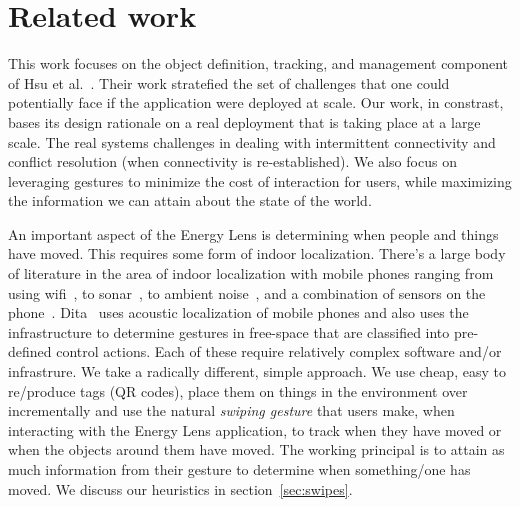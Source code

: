 \section{Related work}


This work focuses on the object definition, tracking, and management component of Hsu et al.~\cite{hbci}.  Their
work stratefied the set of challenges that one could potentially face if the application were deployed at scale.  Our
work, in constrast, bases its design rationale on a real deployment that is taking place at a large scale.
The real systems challenges in dealing with intermittent connectivity
and conflict resolution (when connectivity is re-established).  We also focus on leveraging gestures to minimize
the cost of interaction for users, while maximizing the information we can attain about the state of the world.

An important aspect of the Energy Lens is determining when people and things have moved.  This requires some form 
of indoor localization.  There's a large body of literature in the area of indoor localization with mobile phones ranging from 
using wifi~\cite{radar}, to sonar~\cite{cricket}, to ambient noise~\cite{abs}, and a combination of sensors on the 
phone~\cite{surroundsense, darwinphone}.  Dita~\cite{dita} uses acoustic localization of mobile phones and also uses the infrastructure 
to determine gestures in free-space that are classified into pre-defined control actions.  Each of these require relatively complex 
software and/or infrastrure.  
We take a radically different, simple approach.  We use cheap, easy to re/produce tags (QR codes), place them on things in the 
environment over incrementally and use the natural \emph{swiping gesture} that users make, when interacting with the Energy Lens 
application, to track when they have moved or when the objects around them have moved.  The working principal is to attain as much 
information from their gesture to determine when something/one has moved.  We discuss our heuristics in section~\ref{sec:swipes}.

